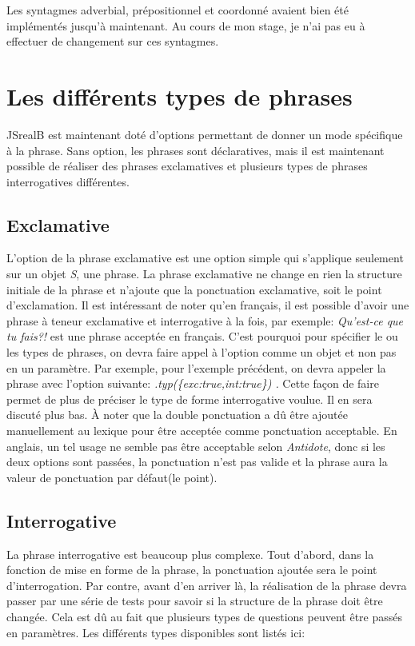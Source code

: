 \documentclass[11pt]{article} %
\begin{document}
Les syntagmes adverbial, prépositionnel et coordonné avaient bien
été implémentés jusqu'à maintenant. Au cours de mon stage, je n'ai
pas eu à effectuer de changement sur ces syntagmes.

\section{Les différents types de phrases}
JSrealB est maintenant doté d'options permettant de donner un mode
spécifique à la phrase. Sans option, les phrases sont déclaratives,
mais il est maintenant possible de réaliser des phrases exclamatives
et plusieurs types de phrases interrogatives différentes. 

\subsection{Exclamative}

L'option de la phrase exclamative est une option simple qui s'applique
seulement sur un objet \emph{S}, une phrase. La phrase exclamative
ne change en rien la structure initiale de la phrase et n'ajoute que
la ponctuation exclamative, soit le point d'exclamation. Il est intéressant
de noter qu'en français, il est possible d'avoir une phrase à teneur
exclamative et interrogative à la fois, par exemple: \emph{Qu'est-ce
que tu fais?!} est une phrase acceptée en français. C'est pourquoi
pour spécifier le ou les types de phrases, on devra faire appel à
l'option comme un objet et non pas en un paramètre. Par exemple, pour
l'exemple précédent, on devra appeler la phrase avec l'option suivante:
\emph{.typ(\{exc:true,int:true\}) . }Cette façon de faire permet de
plus de préciser le type de forme interrogative voulue. Il en sera
discuté plus bas. À noter que la double ponctuation a dû être ajoutée
manuellement au lexique pour être acceptée comme ponctuation acceptable.
En anglais, un tel usage ne semble pas être acceptable selon \emph{Antidote},
donc si les deux options sont passées, la ponctuation n'est pas valide
et la phrase aura la valeur de ponctuation par défaut(le point).

\subsection{Interrogative}
\label{question}

La phrase interrogative est beaucoup plus complexe.
Tout d'abord, dans la fonction de mise en forme de la phrase, la
ponctuation ajoutée sera le point d'interrogation. Par contre, avant
d'en arriver là, la réalisation de la phrase devra passer par une
série de tests pour savoir si la structure de la phrase doit être
changée. Cela est dû au fait que plusieurs types de questions peuvent
être passés en paramètres. Les différents types disponibles sont listés
ici:
\end{document}
